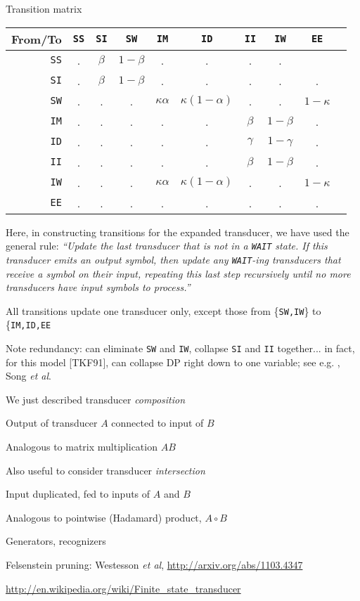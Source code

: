 \documentclass{beamer}
\begin{document}
\begin{frame}{}
Transition matrix
\begin{tabular}{r|ccccccccc}
From/To & {\tt SS} & {\tt SI} & {\tt SW} & {\tt IM} & {\tt ID} & {\tt II} & {\tt IW} & {\tt EE} \\
\hline
{\tt SS} & . & $\beta$ & $1-\beta$ & . & . & . & . \\
{\tt SI} & . & $\beta$ & $1-\beta$ & . & . & . & . & . \\
{\tt SW} & . & . & . & $\kappa\alpha$ & $\kappa(1-\alpha)$ & . & . & $1-\kappa$ \\
{\tt IM} & . & . & . & . & . & $\beta$ & $1-\beta$ & . \\
{\tt ID} & . & . & . & . & . & $\gamma$ & $1-\gamma$ & . \\
{\tt II} & . & . & . & . & . & $\beta$ & $1-\beta$ & . \\
{\tt IW} & . & . & . & $\kappa\alpha$ & $\kappa(1-\alpha)$ & . & . & $1-\kappa$ \\
{\tt EE} & . & . & . & . & . & . & . & .
\end{tabular}
\end{frame}

\begin{frame}{}
 Here, in constructing transitions for the expanded transducer, we have used the general rule:
{\em``Update the last transducer that is not in a {\tt WAIT} state. If this transducer emits an output symbol,
 then update any {\tt WAIT}-ing transducers that receive a symbol on their input,
 repeating this last step recursively until no more transducers have input symbols to process.''}

All transitions update one transducer only, except those from \{{\tt SW,IW}\} to \{{\tt IM,ID,EE}

Note redundancy: can eliminate {\tt SW} and {\tt IW}, collapse {\tt SI} and {\tt II} together...
in fact, for this model [TKF91], can collapse DP right down to one variable; see e.g. \Miklos, Song {\em et al}.
\end{frame}

\begin{frame}{}
\itemb
\item We just described transducer {\em composition}
 \itemb
 \item Output of transducer $A$ connected to input of $B$
 \item Analogous to matrix multiplication $AB$
 \iteme
\item Also useful to consider transducer {\em intersection}
 \itemb
 \item Input duplicated, fed to inputs of $A$ and $B$
 \item Analogous to pointwise (Hadamard) product, $A \circ B$
 \iteme
\item Generators, recognizers
\item Felsenstein pruning: Westesson {\em et al}, \url{http://arxiv.org/abs/1103.4347}
\iteme
\small
\centerline{ \url{http://en.wikipedia.org/wiki/Finite_state_transducer} }
\normalsize
\end{frame}
\end{document}
